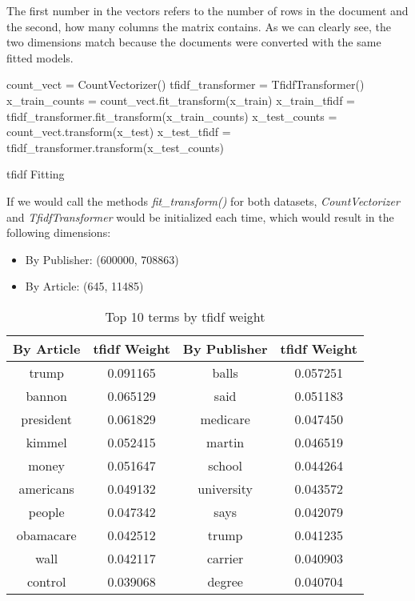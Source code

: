 \documentclass[a4paper, 11pt,titlepage,oneside,openany]{book}
\begin{document}
\noindent The first number in the vectors refers to the number of rows in the document and the second, how many columns the matrix contains. As we can clearly see, the two dimensions match because the documents were converted with the same fitted models. \\
\noindent
\begin{algorithm}[H]
	\DontPrintSemicolon
	count\_vect = CountVectorizer()\;
	tfidf\_transformer = TfidfTransformer()\;
	\BlankLine
	x\_train\_counts = count\_vect.fit\_transform(x\_train)\;
	x\_train\_tfidf = tfidf\_transformer.fit\_transform(x\_train\_counts)\;
	\BlankLine
	x\_test\_counts = count\_vect.transform(x\_test)\;
	x\_test\_tfidf = tfidf\_transformer.transform(x\_test\_counts)\;
	\caption{\gls{tfidf} Fitting}
\end{algorithm}
\noindent If we would call the methods \textit{fit\_transform()} for both datasets, \textit{CountVectorizer} and \textit{TfidfTransformer} would be initialized each time, which would result in the following dimensions:
\begin{itemize}
	\item By Publisher: (600000, 708863)
	\item By Article: (645, 11485)	
\end{itemize}

\newpage
\begin{table}[t]
	\centering
			\begin{tabular}{cc|cc}
				\toprule
				By Article & \Gls{tfidf} Weight & By Publisher & \Gls{tfidf} Weight \\
				\midrule
				trump & 0.091165 & balls & 0.057251\\
				bannon & 0.065129 & said & 0.051183 \\
				president & 0.061829 & medicare & 0.047450 \\
				kimmel & 0.052415 & martin & 0.046519 \\
				money & 0.051647 & school & 0.044264\\
				americans & 0.049132 & university & 0.043572\\
				people & 0.047342 & says & 0.042079 \\
				obamacare & 0.042512 & trump & 0.041235\\
				wall & 0.042117 & carrier & 0.040903\\
				control & 0.039068 & degree & 0.040704\\
				\bottomrule
			\end{tabular}
		\caption{Top 10 terms by \Gls{tfidf} weight}
\end{table}
\end{document}
